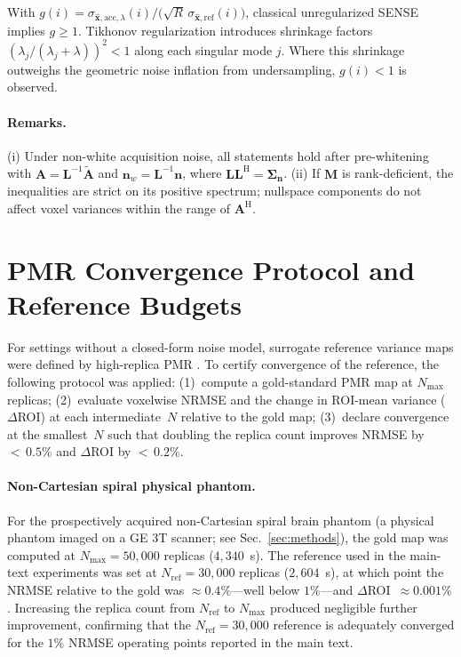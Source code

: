 \documentclass[AMA,STIX2COL,Linenumberson]{MRM}
\begin{document}
\begin{corollary}
\label{cor:g-less-than-one-app}
With $g(i) 
= \sigma_{\hat{\mathbf{x}},\mathrm{acc},\lambda}(i) 
  \big/ \bigl(\sqrt{R}\,
  \sigma_{\hat{\mathbf{x}},\mathrm{ref}}(i)\bigr)$,
classical unregularized SENSE implies $g \ge 1$.
Tikhonov regularization introduces shrinkage factors 
$(\lambda_j / (\lambda_j + \lambda))^2 < 1$ along each 
singular mode $j$. Where this shrinkage outweighs the 
geometric noise inflation from undersampling, 
$g(i) < 1$ is observed.
\end{corollary}
 
\paragraph{Remarks.}
(i) Under non-white acquisition noise, all statements hold 
after pre-whitening with 
$\mathbf{A} = \mathbf{L}^{-1}\widetilde{\mathbf{A}}$ and 
$\mathbf{n}_w = \mathbf{L}^{-1}\mathbf{n}$, where 
$\mathbf{L}\mathbf{L}^{\mathrm{H}} 
= \boldsymbol{\Sigma}_{\mathbf{n}}$.
(ii) If $\mathbf{M}$ is rank-deficient, the inequalities are 
strict on its positive spectrum; nullspace components do not 
affect voxel variances within the range of 
$\mathbf{A}^{\mathrm{H}}$.
 
 
\section{PMR Convergence Protocol and Reference Budgets}
\label{app:pmr_convergence}
 
For settings without a closed-form noise model, surrogate 
reference variance maps were defined by high-replica PMR 
\cite{pmr}. To certify convergence of the reference, the 
following protocol was applied: (1)~compute a gold-standard 
PMR map at $N_{\max}$ replicas; (2)~evaluate voxelwise NRMSE 
and the change in ROI-mean variance ($\Delta$ROI) at each 
intermediate~$N$ relative to the gold map; (3)~declare 
convergence at the smallest~$N$ such that doubling the 
replica count improves NRMSE by ${<}\,0.5\%$ and $\Delta$ROI 
by ${<}\,0.2\%$.
 
\paragraph{Non-Cartesian spiral physical phantom.}
For the prospectively acquired non-Cartesian spiral brain phantom (a physical phantom imaged on a GE 3T scanner; see Sec.~\ref{sec:methods}), the gold map was 
computed at $N_{\max} = 50{,}000$ replicas ($4{,}340$~s). 
The reference used in the main-text experiments was set at 
$N_{\mathrm{ref}} = 30{,}000$ replicas ($2{,}604$~s), at 
which point the NRMSE relative to the gold was 
$\approx 0.4\%$---well below $1\%$---and 
$\Delta$ROI~$\approx 0.001\%$. Increasing the replica count 
from $N_{\mathrm{ref}}$ to $N_{\max}$ produced negligible 
further improvement, confirming that the 
$N_{\mathrm{ref}} = 30{,}000$ reference is adequately 
converged for the $1\%$ NRMSE operating points reported in 
the main text.
 
\end{document}
